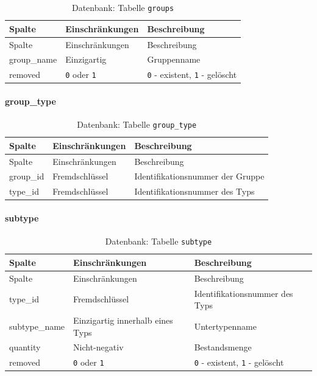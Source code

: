 \documentclass[
]{article}
\begin{document}
\begin{longtable}[]{@{}lll@{}}
\caption{\label{tab:groups} Datenbank: Tabelle \texttt{groups}}\tabularnewline
\toprule
Spalte & Einschränkungen & Beschreibung \\
\midrule
\endfirsthead
\toprule
Spalte & Einschränkungen & Beschreibung \\
\midrule
\endhead
group\_name & Einzigartig & Gruppenname \\
removed & \texttt{0} oder \texttt{1} & \texttt{0} - existent, \texttt{1} - gelöscht \\
\bottomrule
\end{longtable}

\hypertarget{group_type}{%
\paragraph{group\_type}\label{group_type}}

\begin{longtable}[]{@{}lll@{}}
\caption{\label{tab:group-type} Datenbank: Tabelle \texttt{group\_type}}\tabularnewline
\toprule
Spalte & Einschränkungen & Beschreibung \\
\midrule
\endfirsthead
\toprule
Spalte & Einschränkungen & Beschreibung \\
\midrule
\endhead
group\_id & Fremdschlüssel & Identifikationsnummer der Gruppe \\
type\_id & Fremdschlüssel & Identifikationsnummer des Typs \\
\bottomrule
\end{longtable}

\hypertarget{subtype}{%
\paragraph{subtype}\label{subtype}}

\begin{longtable}[]{@{}lll@{}}
\caption{\label{tab:subtype} Datenbank: Tabelle \texttt{subtype}}\tabularnewline
\toprule
Spalte & Einschränkungen & Beschreibung \\
\midrule
\endfirsthead
\toprule
Spalte & Einschränkungen & Beschreibung \\
\midrule
\endhead
type\_id & Fremdschlüssel & Identifikationsnummer des Typs \\
subtype\_name & Einzigartig innerhalb eines Typs & Untertypenname \\
quantity & Nicht-negativ & Bestandsmenge \\
removed & \texttt{0} oder \texttt{1} & \texttt{0} - existent, \texttt{1} - gelöscht \\
\bottomrule
\end{longtable}
\end{document}
